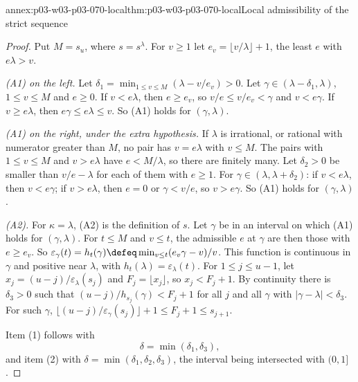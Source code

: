 \begin{annexitem}{annex:p03-w03-p03-070-local}{thm:p03-w03-p03-070-local}{Local admissibility of the strict sequence}
\begin{proof}
Put \(M=s_u\), where \(s=s^\lambda\).  For \(v\geq1\) let
\(e_v=\lfloor v/\lambda\rfloor+1\), the least \(e\) with \(e\lambda>v\).

\emph{(A1) on the left.}  Let \(\delta_1=\min_{1\leq v\leq M}(\lambda-v/e_v)>0\).
Let \(\gamma\in(\lambda-\delta_1,\lambda)\), \(1\leq v\leq M\) and
\(e\geq0\).  If \(v<e\lambda\), then \(e\geq e_v\), so
\(v/e\leq v/e_v<\gamma\) and \(v<e\gamma\).  If \(v\geq e\lambda\), then
\(e\gamma\leq e\lambda\leq v\).  So (A1) holds for \((\gamma,\lambda)\).

\emph{(A1) on the right, under the extra hypothesis.}  If \(\lambda\) is
irrational, or rational with numerator greater than \(M\), no pair has
\(v=e\lambda\) with \(v\leq M\).  The pairs with \(1\leq v\leq M\) and
\(v>e\lambda\) have \(e<M/\lambda\), so there are finitely many.  Let
\(\delta_2>0\) be smaller than \(v/e-\lambda\) for each of them with
\(e\geq1\).  For \(\gamma\in(\lambda,\lambda+\delta_2)\): if \(v<e\lambda\),
then \(v<e\gamma\); if \(v>e\lambda\), then \(e=0\) or \(\gamma<v/e\), so
\(v>e\gamma\).  So (A1) holds for \((\gamma,\lambda)\).

\emph{(A2).}  For \(\kappa=\lambda\), (A2) is the definition of \(s\).  Let
\(\gamma\) be in an interval on which (A1) holds for \((\gamma,\lambda)\).
For \(t\leq M\) and \(v\leq t\), the admissible \(e\) at \(\gamma\) are then
those with \(e\geq e_v\).  So
\(\varepsilon_\gamma(t)=h_t(\gamma)\defeq\min_{v\leq t}(e_v\gamma-v)/v\).
This function is continuous in \(\gamma\) and positive near \(\lambda\), with
\(h_t(\lambda)=\varepsilon_\lambda(t)\).  For \(1\leq j\leq u-1\), let
\(x_j=(u-j)/\varepsilon_\lambda(s_j)\) and \(F_j=\lfloor x_j\rfloor\), so
\(x_j<F_j+1\).  By continuity there is \(\delta_3>0\) such that
\((u-j)/h_{s_j}(\gamma)<F_j+1\) for all \(j\) and all \(\gamma\) with
\(|\gamma-\lambda|<\delta_3\).  For such \(\gamma\),
\(\lfloor(u-j)/\varepsilon_\gamma(s_j)\rfloor+1\leq F_j+1\leq s_{j+1}\).

Item (1) follows with
\[
 \delta=\min(\delta_1,\delta_3),
\]
and item (2) with \(\delta=\min(\delta_1,\delta_2,\delta_3)\), the interval
being intersected with \((0,1]\).
\end{proof}
\end{annexitem}

